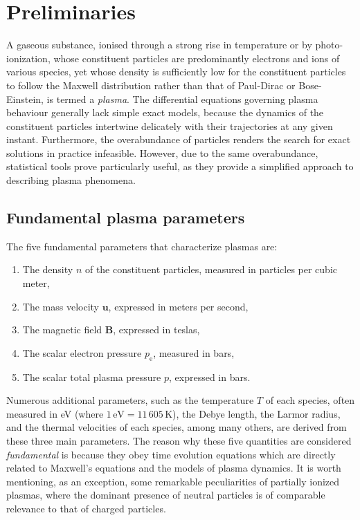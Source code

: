 
\chapter{Preliminaries}

\label{fundamentals}


A gaseous substance, ionised through a strong rise in temperature or by photo-ionization, whose constituent particles are predominantly electrons and ions of various species, yet whose density is sufficiently low for the constituent particles to follow the Maxwell distribution rather than that of Paul-Dirac or Bose-Einstein, is termed a \textit{plasma}. The differential equations governing plasma behaviour generally lack simple exact models, because the dynamics of the constituent particles intertwine delicately with their trajectories at any given instant. Furthermore, the overabundance of particles renders the search for exact solutions in practice infeasible. However, due to the same overabundance, statistical tools prove particularly useful, as they provide a simplified approach to describing plasma phenomena.

\section{Fundamental plasma parameters}

The five fundamental parameters that characterize plasmas are:

\begin{enumerate}
    \item The density $n$ of the constituent particles, measured in particles per cubic meter,
    \item The mass velocity $\mathbf{u}$, expressed in meters per second,
    \item The magnetic field $\mathbf{B}$, expressed in teslas,
    \item The scalar electron pressure $p_\text{e}$, measured in bars,
    \item The scalar total plasma pressure $p$, expressed in bars.
\end{enumerate}

Numerous additional parameters, such as the temperature $T$ of each species, often measured in eV (where $1\,\text{eV}=11\,605\,\text{K}$), the Debye length, the Larmor radius, and the thermal velocities of each species, among many others, are derived from these three main parameters. The reason why these five quantities are considered \textit{fundamental} is because they obey time evolution equations which are directly related to Maxwell's equations and the models of plasma dynamics. It is worth mentioning, as an exception, some remarkable peculiarities of partially ionized plasmas, where the dominant presence of neutral particles is of comparable relevance to that of charged particles.

